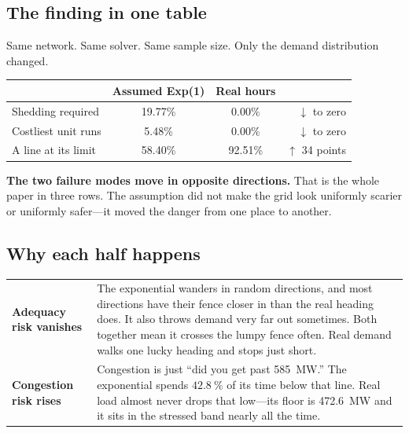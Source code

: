 \documentclass[11pt,a4paper]{article}
\begin{document}
\subsection{The finding in one table}

Same network. Same solver. Same sample size. Only the demand distribution
changed.

\begin{center}
\begin{tabular}{@{}lccr@{}}
\toprule
& \textbf{Assumed Exp(1)} & \textbf{Real hours} & \\
\midrule
Shedding required        & 19.77\% & \phantom{0}0.00\% & $\downarrow$ to zero \\
Costliest unit runs      & \phantom{0}5.48\% & \phantom{0}0.00\% & $\downarrow$ to zero \\
A line at its limit      & 58.40\% & 92.51\% & $\uparrow$ 34 points \\
\bottomrule
\end{tabular}
\end{center}

\textbf{The two failure modes move in opposite directions.} That is the whole
paper in three rows. The assumption did not make the grid look uniformly
scarier or uniformly safer---it moved the danger from one place to another.

\subsection{Why each half happens}

\begin{center}
\small
\begin{tabular}{@{}p{}p{}@{}}
\toprule
\textbf{Adequacy risk vanishes} & The exponential wanders in random directions,
and most directions have their fence closer in than the real heading does. It
also throws demand very far out sometimes. Both together mean it crosses the
lumpy fence often. Real demand walks one lucky heading and stops just short.
\\[0.7em]
\textbf{Congestion risk rises} & Congestion is just ``did you get past
\SI{585}{\mega\watt}.'' The exponential spends $\SI{42.8}{\percent}$ of its time
below that line. Real load almost never drops that low---its floor is
\SI{472.6}{\mega\watt} and it sits in the stressed band nearly all the time.
\\
\bottomrule
\end{tabular}
\end{center}
\end{document}
